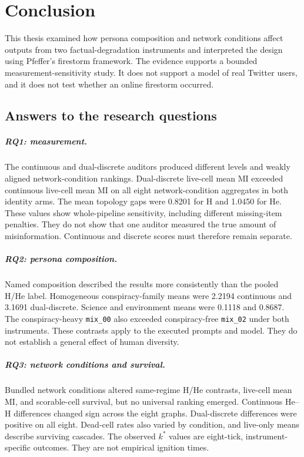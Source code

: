 
\chapter{Conclusion}
\label{chap:conclusion}

This thesis examined how persona composition and network conditions affect
outputs from two factual-degradation instruments and interpreted the design
using Pfeffer's firestorm framework. The evidence supports a bounded
measurement-sensitivity study. It does not support a model of real Twitter
users, and it does not test whether an online firestorm occurred.

\section{Answers to the research questions}

\paragraph{RQ1: measurement.}
The continuous and dual-discrete auditors produced different levels and weakly
aligned network-condition rankings. Dual-discrete live-cell mean MI exceeded
continuous live-cell mean MI on all eight network-condition aggregates in both
identity arms. The mean topology gaps were 0.8201 for H and 1.0450 for He.
These values show whole-pipeline sensitivity, including different missing-item
penalties. They do not show that one auditor measured the true amount of
misinformation. Continuous and discrete scores must therefore remain separate.

\paragraph{RQ2: persona composition.}
Named composition described the results more consistently than the pooled H/He
label. Homogeneous conspiracy-family means were 2.2194 continuous and 3.1691
dual-discrete. Science and environment means were 0.1118 and 0.8687. The
conspiracy-heavy \texttt{mix\_00} also exceeded conspiracy-free
\texttt{mix\_02} under both instruments. These contrasts apply to the executed
prompts and model. They do not establish a general effect of human diversity.

\paragraph{RQ3: network conditions and survival.}
Bundled network conditions altered same-regime H/He contrasts, live-cell mean
MI, and scorable-cell survival, but no universal ranking emerged. Continuous
He--H differences changed sign across the eight graphs. Dual-discrete
differences were positive on all eight. Dead-cell rates also varied by
condition, and live-only means describe surviving cascades. The observed
\(k^{*}\) values are eight-tick, instrument-specific outcomes. They are not
empirical ignition times.

